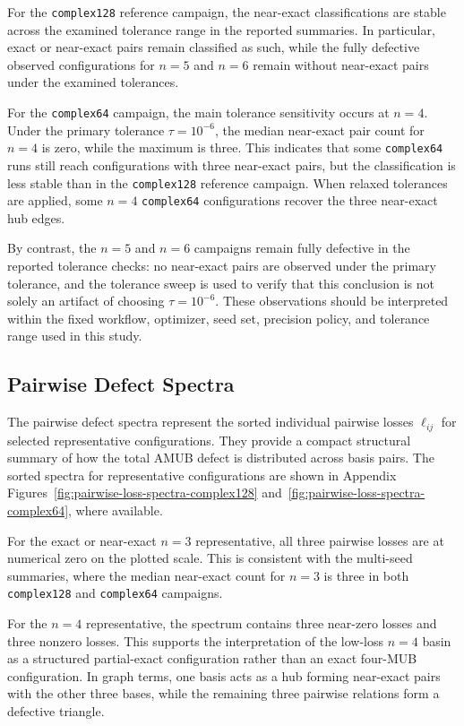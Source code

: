 \documentclass[a4paper,twocolumn,11pt,amsfonts,amssymb]{quantumarticle}
\begin{document}
For the \texttt{complex128} reference campaign, the near-exact classifications are stable across the examined tolerance range in the reported summaries. In particular, exact or near-exact pairs remain classified as such, while the fully defective observed configurations for \(n=5\) and \(n=6\) remain without near-exact pairs under the examined tolerances.

For the \texttt{complex64} campaign, the main tolerance sensitivity occurs at \(n=4\). Under the primary tolerance \(\tau=10^{-6}\), the median near-exact pair count for \(n=4\) is zero, while the maximum is three. This indicates that some \texttt{complex64} runs still reach configurations with three near-exact pairs, but the classification is less stable than in the \texttt{complex128} reference campaign. When relaxed tolerances are applied, some \(n=4\) \texttt{complex64} configurations recover the three near-exact hub edges.

By contrast, the \(n=5\) and \(n=6\) campaigns remain fully defective in the reported tolerance checks: no near-exact pairs are observed under the primary tolerance, and the tolerance sweep is used to verify that this conclusion is not solely an artifact of choosing \(\tau=10^{-6}\). These observations should be interpreted within the fixed workflow, optimizer, seed set, precision policy, and tolerance range used in this study.

\subsection{Pairwise Defect Spectra}
\label{subsec:pairwise-defect-spectra}

The pairwise defect spectra represent the sorted individual pairwise losses \(\ell_{ij}\) for selected representative configurations. They provide a compact structural summary of how the total AMUB defect is distributed across basis pairs. The sorted spectra for representative configurations are shown in Appendix Figures~\ref{fig:pairwise-loss-spectra-complex128} and~\ref{fig:pairwise-loss-spectra-complex64}, where available.

For the exact or near-exact \(n=3\) representative, all three pairwise losses are at numerical zero on the plotted scale. This is consistent with the multi-seed summaries, where the median near-exact count for \(n=3\) is three in both \texttt{complex128} and \texttt{complex64} campaigns.

For the \(n=4\) representative, the spectrum contains three near-zero losses and three nonzero losses. This supports the interpretation of the low-loss \(n=4\) basin as a structured partial-exact configuration rather than an exact four-MUB configuration. In graph terms, one basis acts as a hub forming near-exact pairs with the other three bases, while the remaining three pairwise relations form a defective triangle.
\end{document}
